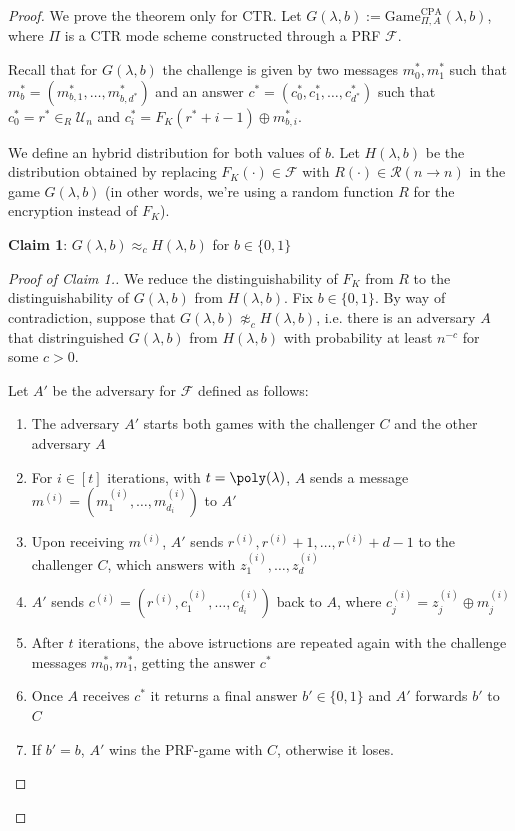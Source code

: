 \documentclass[a4paper, 12pt]{report}
\begin{document}
    \begin{proof}
        We prove the theorem only for CTR. Let $G(\lambda, b) := \mathrm{Game}^{\text{CPA}}_{\Pi,A}(\lambda,b)$, where $\Pi$ is a CTR mode scheme constructed through a PRF $\mathcal{F}$.

        Recall that for $G(\lambda, b)$ the challenge is given by two messages $m_0^*, m_1^*$ such that $m_b^* = (m^*_{b,1}, \ldots, m^*_{b,d^*})$ and an answer $c^* = (c^*_0, c^*_1, \ldots, c^*_{d^*})$ such that $c^*_0 = r^* \in_R \mathcal{U}_n$ and $c^*_i = F_K(r^*+i-1) \oplus m^*_{b,i}$.

        We define an hybrid distribution for both values of $b$. Let $H(\lambda, b)$ be the distribution obtained by replacing $F_K(\cdot) \in \mathcal{F}$ with $R(\cdot) \in \mathcal{R}(n \to n)$ in the game $G(\lambda, b)$ (in other words, we're using a random function $R$ for the encryption instead of $F_K$).

        \textbf{Claim 1}: $G(\lambda, b) \approx_c H(\lambda, b)$ for $b \in \{0,1\}$

        \begin{proof}[Proof of Claim 1.]
            We reduce the distinguishability of $F_K$ from $R$ to the distinguishability of $G(\lambda, b)$ from $H(\lambda, b)$. Fix $b \in \{0,1\}$. By way of contradiction, suppose that $G(\lambda, b) \not\approx_c H(\lambda, b)$, i.e. there is an adversary $A$ that distringuished $G(\lambda, b)$ from $H(\lambda, b)$ with probability at least $n^{-c}$ for some $c > 0$.

            Let $A'$ be the adversary for $\mathcal{F}$ defined as follows:
            \begin{enumerate}
                \item The adversary $A'$ starts both games with the challenger $C$ and the other adversary $A$
                \item For $i \in [t]$ iterations, with $t = \poly(\lambda)$, $A$ sends a message $m^{(i)} = (m^{(i)}_1, \ldots, m^{(i)}_{d_i})$ to $A'$
                \item Upon receiving $m^{(i)}$, $A'$ sends $r^{(i)}, r^{(i)}+1, \ldots, r^{(i)}+d-1$ to the challenger $C$, which answers with $z^{(i)}_1, \ldots, z^{(i)}_d$
                \item $A'$ sends $c^{(i)} = (r^{(i)}, c^{(i)}_1, \ldots, c^{(i)}_{d_i})$ back to $A$, where $c^{(i)}_j = z^{(i)}_j \oplus m^{(i)}_j$
                \item After $t$ iterations, the above istructions are repeated again with the challenge messages $m_0^*, m_1^*$, getting the answer $c^*$
                \item Once $A$ receives $c^*$ it returns a final answer $b' \in \{0,1\}$ and $A'$ forwards $b'$ to $C$
                \item If $b' = b$, $A'$ wins the PRF-game with $C$, otherwise it loses.
            \end{enumerate}


\end{proof}
\end{proof}
\end{document}
